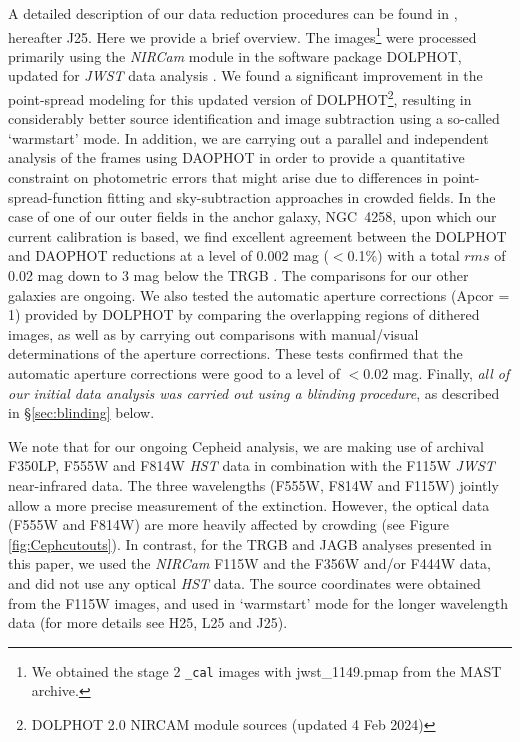 \documentclass[12pt,modern]{aastex631}
\newcommand{\hst}{\emph{HST}\xspace}
\newcommand{\jwst}{\emph{JWST}\xspace}
\newcommand{\nircam}{\emph{NIRCam}\xspace}
\newcommand{\ngc}{NGC\,\xspace}
\begin{document}
A detailed description of our data reduction procedures can be found in \citet{jang_2025}, hereafter J25. Here we provide a brief overview.  The images\footnote{We obtained the stage 2 \texttt{\_cal} images with jwst\_1149.pmap from the MAST archive.} were processed primarily using the \nircam module in the software package DOLPHOT, updated for \jwst data analysis \citep{weisz_2023, weisz_2024}. We found a significant improvement in the point-spread modeling for this updated version of DOLPHOT\footnote{DOLPHOT 2.0 NIRCAM module sources (updated 4 Feb 2024)}, resulting in considerably better source identification and image subtraction using a so-called `warmstart' mode. In addition, we are carrying out a parallel and independent analysis of the frames using DAOPHOT \citep{stetson_1987} in order to provide a quantitative constraint on photometric errors that might arise due to differences in point-spread-function fitting and sky-subtraction approaches in crowded fields.  
In the case of one of our outer fields in the anchor galaxy, \ngc 4258, upon which our current calibration is based, we find excellent agreement between the DOLPHOT and DAOPHOT reductions at a level of 0.002 mag ($<$0.1\%) with a total $rms$ of 0.02 mag down to 3 mag below the TRGB \citep{hoyt_2025b}. The comparisons for our other galaxies are ongoing. We also tested the automatic aperture corrections (Apcor = 1) provided by DOLPHOT by comparing the overlapping regions of dithered images, as well as by carrying out comparisons with manual/visual determinations of the aperture corrections. These tests confirmed that the  automatic aperture corrections were good to a level of $<$0.02 mag. Finally, {\it  all of our initial data analysis was carried out using a blinding procedure}, as described in \S \ref{sec:blinding} below.

We note that for our ongoing Cepheid analysis, we are making use of archival F350LP, F555W and F814W \hst data in combination with the F115W \jwst near-infrared data. The three wavelengths (F555W, F814W and F115W) jointly allow a more precise measurement of the extinction.  However, the optical data (F555W and F814W) are more heavily affected by crowding (see Figure \ref{fig:Cephcutouts}).
In contrast, for the TRGB and JAGB analyses presented in this paper, we used the \nircam F115W and the F356W and/or F444W data, and did not use any optical \hst data. The source coordinates were obtained from the F115W images, and  used in `warmstart' mode for the longer wavelength data (for more details see H25, L25 and J25). 
\end{document}
